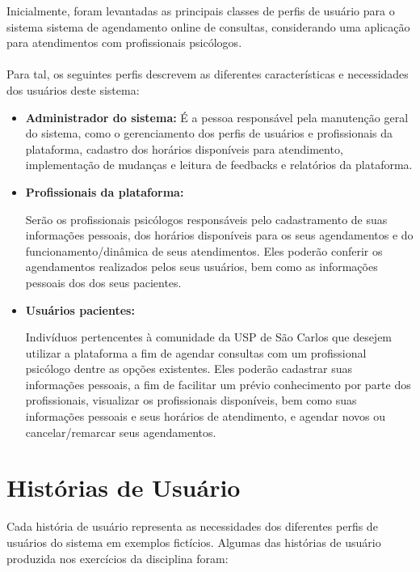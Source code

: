 \documentclass[a4paper,12pt]{report}
\begin{document}
Inicialmente, foram levantadas as principais classes de perfis de usuário para o sistema sistema de agendamento online de consultas, considerando uma aplicação para atendimentos com profissionais psicólogos. \\
\\
Para tal, os seguintes perfis descrevem as diferentes características e necessidades dos usuários deste sistema:
\begin{itemize}
    \item \textbf{Administrador do sistema:} 
É a pessoa responsável pela manutenção geral do sistema, como o gerenciamento dos perfis de usuários e profissionais da plataforma, cadastro dos horários disponíveis para atendimento, implementação de mudanças e leitura de feedbacks e relatórios da plataforma.

\item \textbf{Profissionais da plataforma:}

Serão os profissionais psicólogos responsáveis pelo cadastramento de suas informações pessoais, dos horários disponíveis para os seus agendamentos e do funcionamento/dinâmica de seus atendimentos. Eles poderão conferir os agendamentos realizados pelos seus usuários, bem como as informações pessoais dos dos seus pacientes.

\item \textbf{Usuários pacientes:}

Indivíduos pertencentes à comunidade da USP de São Carlos que desejem utilizar a plataforma a fim de agendar consultas com um profissional psicólogo dentre as opções existentes. Eles poderão cadastrar suas informações pessoais, a fim de facilitar um prévio conhecimento por parte dos profissionais, visualizar os profissionais disponíveis, bem como suas informações pessoais e seus horários de atendimento, e agendar novos ou cancelar/remarcar seus agendamentos.

\end{itemize}

\section{Histórias de Usuário}
Cada história de usuário representa as necessidades dos diferentes perfis de usuários do sistema em exemplos fictícios. Algumas das histórias de usuário produzida nos exercícios da disciplina foram:
\end{document}
